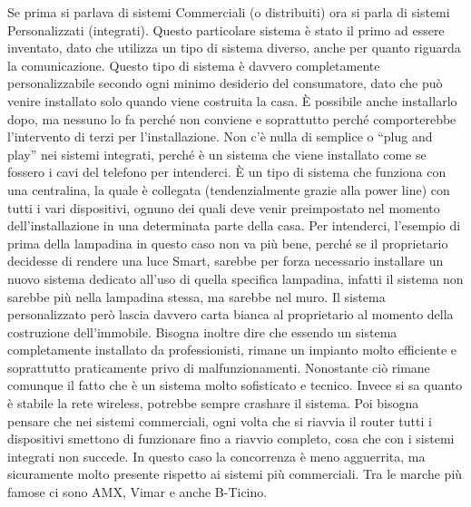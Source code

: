 Se prima si parlava di sistemi Commerciali (o distribuiti) ora si parla di sistemi Personalizzati (integrati). 
Questo particolare sistema è stato il primo ad essere inventato, dato che utilizza un tipo di sistema diverso, anche per quanto riguarda la comunicazione.
Questo tipo di sistema è davvero completamente personalizzabile secondo ogni minimo desiderio del consumatore, dato che può venire installato solo quando viene costruita la casa. È possibile anche installarlo dopo, ma nessuno lo fa perché non conviene e soprattutto perché comporterebbe l’intervento di terzi per l’installazione. 
Non c’è nulla di semplice o “plug and play” nei sistemi integrati, perché è un sistema che viene installato come se fossero i cavi del telefono per intenderci. È un tipo di sistema che funziona con una centralina, la quale è collegata (tendenzialmente grazie alla power line) con tutti i vari dispositivi, ognuno dei quali deve venir preimpostato nel momento dell’installazione in una determinata parte della casa. 
Per intenderci, l’esempio di prima della lampadina in questo caso non va più bene, perché se il proprietario decidesse di rendere una luce Smart, sarebbe per forza necessario installare un nuovo sistema dedicato all’uso di quella specifica lampadina, infatti il sistema non sarebbe più nella lampadina stessa, ma sarebbe nel muro. 
Il sistema personalizzato però lascia davvero carta bianca al proprietario al momento della costruzione dell’immobile. Bisogna inoltre dire che essendo un sistema completamente installato da professionisti, rimane un impianto molto efficiente e soprattutto praticamente privo di malfunzionamenti. Nonostante ciò rimane comunque il fatto che è un sistema molto sofisticato e tecnico. 
Invece si sa quanto è stabile la rete wireless, potrebbe sempre crashare il sistema. Poi bisogna pensare che nei sistemi commerciali, ogni volta che si riavvia il router tutti i dispositivi smettono di funzionare fino a riavvio completo, cosa che con i sistemi integrati non succede.
In questo caso la concorrenza è meno agguerrita, ma sicuramente molto presente rispetto ai sistemi più commerciali. Tra le marche più famose ci sono AMX, Vimar e anche B-Ticino.
